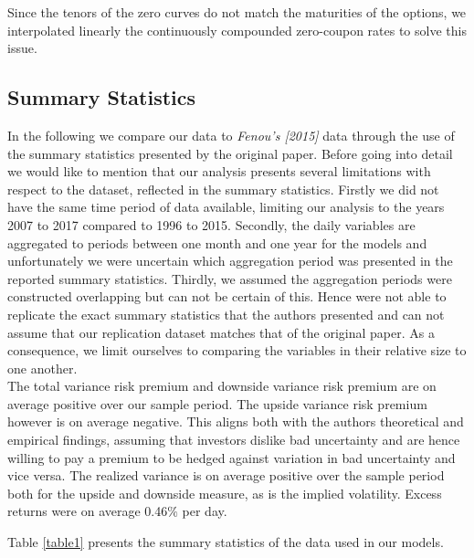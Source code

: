Since the tenors of the zero curves do not match the maturities of the options, we interpolated linearly the continuously compounded zero-coupon rates to solve this issue.


\subsection{Summary Statistics}

In the following we compare our data to \textit{Fenou's [2015]} data through the use of the summary statistics presented by the original paper. Before going into detail we would like to mention that our analysis presents several limitations with respect to the dataset, reflected in the summary statistics. Firstly we did not have the same time period of data available, limiting our analysis to the years 2007 to 2017 compared to 1996 to 2015. Secondly, the daily variables are aggregated to periods between one month and one year for the models and unfortunately we were uncertain which aggregation period was presented in the reported summary statistics.  Thirdly, we assumed the aggregation periods were constructed overlapping but can not be certain of this. Hence were not able to replicate the exact summary statistics that the authors presented and can not assume that our replication dataset matches that of the original paper. As a consequence, we limit ourselves to comparing the variables in their relative size to one another.\\

The total variance risk premium and downside variance risk premium are on average positive over our sample period. The upside variance risk premium however is on average negative. This aligns both with the authors theoretical and empirical findings, assuming that investors dislike bad uncertainty and are hence willing to pay a premium to be hedged against variation in bad uncertainty and vice versa. The realized variance is on average positive over the sample period both for the upside and downside measure, as is the implied volatility. Excess returns were on average 0.46$\%$ per day.

Table \ref{table1} presents the summary statistics of the data used in our models. 

